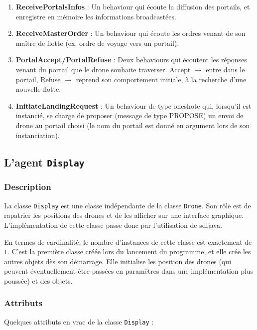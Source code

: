 \documentclass[11pt]{report}
\begin{document}
\begin{enumerate}
\item \textbf{ReceivePortalsInfos} : Un behaviour qui écoute la diffusion des portails, et enregistre en mémoire les informations broadcastées.

\item \textbf{ReceiveMasterOrder} : Un behaviour qui écoute les ordres venant de son maître de flotte (ex. ordre de voyage vers un portail).

\item \textbf{PortalAccept/PortalRefuse} : Deux behaviours qui écoutent les réponses venant du portail que le drone souhaite traverser. Accept $\rightarrow$ entre dans le portail, Refuse $\rightarrow$ reprend son comportement initiale, à la recherche d'une nouvelle flotte.

\item \textbf{InitiateLandingRequest} : Un behaviour de type oneshote qui, lorsqu'il est instancié, se charge de proposer (message de type PROPOSE) un envoi de drone au portail choisi (le nom du portail est donné en argument lors de son instanciation).
\end{enumerate}

\subsection{L'agent \protect\Verb+Display+}

\subsubsection{Description}

La classe \verb|Display| est une classe indépendante de la classe \verb|Drone|. Son rôle est de rapatrier les positions des drones et de les afficher sur une interface graphique. L'implémentation de cette classe passe donc par l'utilisation de sdljava. 

En termes de cardinalité, le nombre d'instances de cette classe est exactement de $1$. C'est la première classe créée lors du lancement du programme, et elle crée les autres objets dès son démarrage. Elle initialise les position des drones (qui peuvent éventuellement être passées en paramètres dans une implémentation plus poussée) et des objets.

\subsubsection{Attributs}

Quelques attributs en vrac de la classe \verb|Display| :
\end{document}
